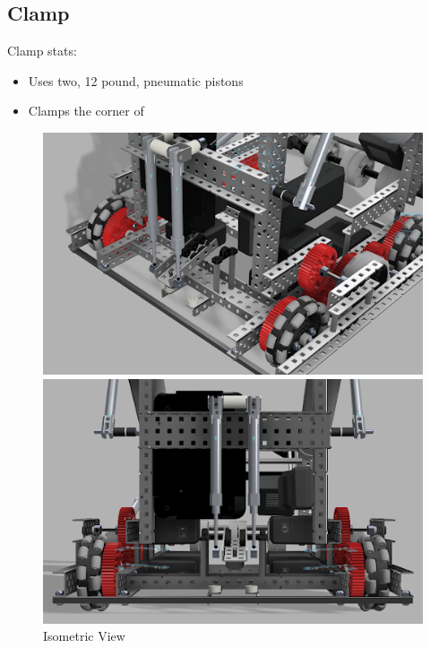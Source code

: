 \subsection*{Clamp}
Clamp stats:
\begin{itemize}
    \item Uses two, 12 pound, pneumatic pistons 
    \item Clamps the corner of 
\end{itemize}
\begin{figure}[h!] %
    \begin{minipage}{.55\textwidth}
        \centering
        \includegraphics[width=1\linewidth]{images/Iso-Clamp-V1.png}
        \caption{Isometric View}
        \label{fig:iso}
    \end{minipage}
    \begin{minipage}{.55\textwidth}
        \centering
        \includegraphics[width=1\linewidth]{images/Front-Clamp-V1.png}

\end{minipage}
\end{figure}
